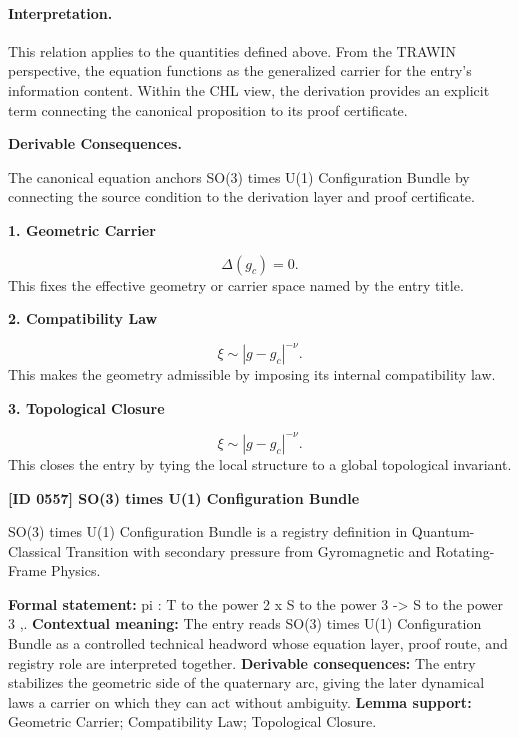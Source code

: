 \paragraph{Interpretation.}
This relation applies to the quantities defined above. From the TRAWIN perspective, the equation functions as the generalized carrier for the entry’s information content. Within the CHL view, the derivation provides an explicit term connecting the canonical proposition to its proof certificate.

\par\vspace{0.35em}
\noindent\textbf{Derivable Consequences.}\quad
\begingroup
\footnotesize
\raggedright
The canonical equation anchors SO(3) times U(1) Configuration Bundle by connecting the source condition to the derivation layer and proof certificate.
\par\endgroup

\noindent\textbf{1. Geometric Carrier}\par
\[
\Delta(g_c)=0.
\]
\noindent This fixes the effective geometry or carrier space named by the entry title.\par
\noindent\textbf{2. Compatibility Law}\par
\[
\xi \sim |g-g_c|^{-\nu}.
\]
\noindent This makes the geometry admissible by imposing its internal compatibility law.\par
\noindent\textbf{3. Topological Closure}\par
\[
\boxed{ \xi \sim |g-g_c|^{-\nu}. }
\]
\noindent This closes the entry by tying the local structure to a global topological invariant.\par

\clearpage
\noindent\textbf{[ID 0557] SO(3) times U(1) Configuration Bundle}\par
\vspace{0.35em}
\begingroup\small
{}
SO(3) times U(1) Configuration Bundle is a registry definition in Quantum-Classical Transition with secondary pressure from Gyromagnetic and Rotating-Frame Physics.

\begingroup\footnotesize\setlength{\emergencystretch}{3em}\sloppy
\textbf{Formal statement:} pi : T to the power 2 x S to the power 3 -> S to the power 3 ,. \textbf{Contextual meaning:} The entry reads SO(3) times U(1) Configuration Bundle as a controlled technical headword whose equation layer, proof route, and registry role are interpreted together. \textbf{Derivable consequences:} The entry stabilizes the geometric side of the quaternary arc, giving the later dynamical laws a carrier on which they can act without ambiguity. \textbf{Lemma support:} Geometric Carrier; Compatibility Law; Topological Closure.\par
\endgroup

